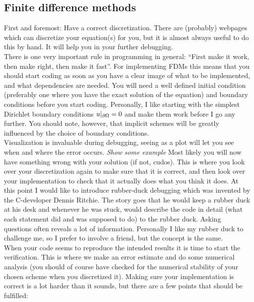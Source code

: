 \subsection{Finite difference methods}
First and foremost: Have a correct discretization. There are (probably) webpages which can discretize your equation(s) for you, but it is almost always useful to do this by hand. 
It will help you in your further debugging. \\
There is one very important rule in programming in general: ``First make it work, then make right, then make it fast''. 
For implementing FDMs this means that you should start coding as soon as you have a clear image of what to be implemented, and what dependencies are needed. You will need a well defined initial condition (preferably one where you have the exact solution of the equation) and boundary conditions before you start coding. 
Personally, I like starting with the simplest Dirichlet boundary conditions $u|_{\partial \Omega} = 0$ and make them work before I go any further. 
You should note, however, that implicit schemes will be greatly influenced by the choice of boundary conditions.\\
Visualization is invaluable during debugging, seeing as a plot will let you see when and where the error occurs. \emph{Show some example}
Most likely you will now have something wrong with your solution (if not, cudos). This is where you look over your discretization again to make sure that it is correct, and then look over your implementation to check that it actually does what you think it does. 
At this point I would like to introduce rubber-duck debugging which was invented by the C-developer Dennis Ritchie. 
The story goes that he would keep a rubber duck at his desk and whenever he was stuck, would describe the code in detail (what each statement did and was supposed to do) to the rubber duck. Asking questions often reveals a lot of information. 
Personally I like my rubber duck to challenge me, so I prefer to involve a friend, but the concept is the same.\\
When your code seems to reproduce the intended results it is time to start the verification. This is where we make an error estimate and do some numerical analysis (you should of course have checked for the numerical stability of your chosen scheme when you discretized it). 
Making sure your implementation is correct is a lot harder than it sounds, but there are a few points that should be fulfilled:
